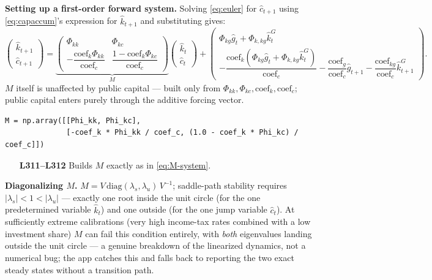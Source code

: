 \documentclass[11pt]{article}
\newcommand{\eq}[1]{\begin{equation}#1\end{equation}}
\begin{document}
\textbf{Setting up a first-order forward system.} Solving \eqref{eq:euler}
for $\hat c_{t+1}$ using \eqref{eq:capaccum}'s expression for $\hat
k_{t+1}$ and substituting gives:
\eq{
\begin{pmatrix}\hat k_{t+1}\\ \hat c_{t+1}\end{pmatrix}
= \underbrace{\begin{pmatrix}\Phi_{kk} & \Phi_{kc}\\[2pt]
              -\dfrac{\text{coef}_k\Phi_{kk}}{\text{coef}_c} & \dfrac{1-\text{coef}_k\Phi_{kc}}{\text{coef}_c}
              \end{pmatrix}}_{\displaystyle M}
  \begin{pmatrix}\hat k_t\\ \hat c_t\end{pmatrix}
  +\begin{pmatrix}\Phi_{kg}\hat g_t+\Phi_{k,kg}\hat k^G_t\\[2pt]
                   -\dfrac{\text{coef}_k(\Phi_{kg}\hat g_t+\Phi_{k,kg}\hat k^G_t)}{\text{coef}_c}-\dfrac{\text{coef}_g}{\text{coef}_c}\hat g_{t+1}-\dfrac{\text{coef}_{kg}}{\text{coef}_c}\hat k^G_{t+1}\end{pmatrix}.
  \label{eq:M-system}
}
$M$ itself is unaffected by public capital --- built only from
$\Phi_{kk},\Phi_{kc},\text{coef}_k,\text{coef}_c$; public capital enters
purely through the additive forcing vector.

\begin{lstlisting}[firstnumber=311]
M = np.array([[Phi_kk, Phi_kc],
              [-coef_k * Phi_kk / coef_c, (1.0 - coef_k * Phi_kc) / coef_c]])
\end{lstlisting}
\begin{itemize}
\item[\textbf{L311--L312}] Builds $M$ exactly as in \eqref{eq:M-system}.
\end{itemize}

\textbf{Diagonalizing $M$.} $M=V\,\text{diag}(\lambda_s,\lambda_u)\,V^{-1}$;
saddle-path stability requires $|\lambda_s|<1<|\lambda_u|$ --- exactly one
root inside the unit circle (for the one predetermined variable $\hat k_t$)
and one outside (for the one jump variable $\hat c_t$). At sufficiently
extreme calibrations (very high income-tax rates combined with a low
investment share) $M$ can fail this condition entirely, with \emph{both}
eigenvalues landing outside the unit circle --- a genuine breakdown of the
linearized dynamics, not a numerical bug; the app catches this and falls
back to reporting the two exact steady states without a transition path.
\end{document}
